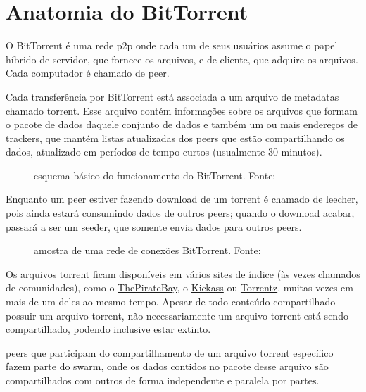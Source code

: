 
\chapter{Anatomia do BitTorrent}

O BitTorrent é uma rede \gls{p2p} onde cada um de seus usuários assume o papel híbrido
de servidor, que fornece os arquivos, e de cliente, que adquire os arquivos. Cada
computador é chamado de \gls{peer}.

Cada transferência por BitTorrent está associada a um arquivo de \glspl{metadata}
chamado \gls{torrent}. Esse arquivo contém informações sobre os arquivos que formam o
pacote de dados daquele conjunto de dados e também um ou mais endereços de
\glspl*{tracker}, que mantém listas atualizadas dos \glspl*{peer} que estão
compartilhando os dados, atualizado em períodos de tempo curtos (usualmente 30 minutos).

\begin{figure}[H]
    \centering
    \caption{esquema básico do funcionamento do BitTorrent. Fonte: \cite[p. 12]{conf:swarming}}
    \label{fig:torrent-basics}
\end{figure}

Enquanto um \gls*{peer} estiver fazendo download de um \gls*{torrent} é chamado de
\gls{leecher}, pois ainda estará consumindo dados de outros \glspl*{peer}; quando o
download acabar, passará a ser um \gls{seeder}, que somente envia dados para outros
\glspl*{peer}.

\begin{figure}[H]
    \centering
    \caption{amostra de uma rede de conexões BitTorrent. Fonte: \cite[p. 13]{conf:swarming}}
    \label{fig:torrent-universo}
\end{figure}

Os arquivos \gls*{torrent} ficam disponíveis em vários sites de índice (às vezes
chamados de comunidades), como o \href{http://thepiratebay.sx/}{ThePirateBay}, o
\href{http://kickass.to/}{Kickass} ou \href{https://torrentz.eu/}{Torrentz}, muitas
vezes em mais de um deles ao mesmo tempo. Apesar de todo conteúdo compartilhado possuir
um arquivo \gls*{torrent}, não necessariamente um arquivo \gls*{torrent} está sendo
compartilhado, podendo inclusive estar extinto.

\Glspl*{peer} que participam do compartilhamento de um arquivo \gls*{torrent} específico
fazem parte do \gls{swarm}, onde os dados contidos no pacote desse arquivo são
compartilhados com outros de forma independente e paralela por partes.

